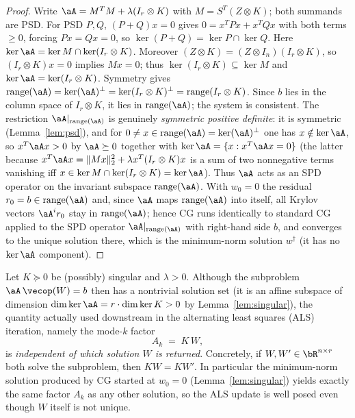 \begin{proof}
Write $\aA=M^{T}M+\lambda(I_r\otimes K)$ with $M=S^{T}(Z\otimes K)$; both
summands are PSD. For PSD $P,Q$, $(P+Q)x=0$ gives
$0=x^{T}Px+x^{T}Qx$ with both terms $\ge0$, forcing $Px=Qx=0$, so
$\ker(P+Q)=\ker P\cap\ker Q$. Here
$\ker\aA=\ker M\cap\ker(I_r\otimes K)$. Moreover
$(Z\otimes K)=(Z\otimes I_n)(I_r\otimes K)$, so $(I_r\otimes K)x=0$ implies
$Mx=0$; thus $\ker(I_r\otimes K)\subseteq\ker M$ and
$\ker\aA=\ker(I_r\otimes K)$. Symmetry gives
$\operatorname{range}(\aA)=\ker(\aA)^{\perp}=\ker(I_r\otimes K)^{\perp}
=\operatorname{range}(I_r\otimes K)$. Since $b$ lies in the column space of
$I_r\otimes K$, it lies in $\operatorname{range}(\aA)$; the system is
consistent. The restriction $\aA|_{\operatorname{range}(\aA)}$ is genuinely
\emph{symmetric positive definite}: it is symmetric (Lemma~\ref{lem:psd}), and
for $0\neq x\in\operatorname{range}(\aA)=\ker(\aA)^{\perp}$ one has $x\notin\ker\aA$,
so $x^{T}\aA x>0$ by $\aA\succeq0$ together with $\ker\aA=\{x:x^{T}\aA x=0\}$
(the latter because $x^{T}\aA x=\|Mx\|_2^2+\lambda x^{T}(I_r\otimes K)x$ is a sum
of two nonnegative terms vanishing iff $x\in\ker M\cap\ker(I_r\otimes K)=\ker\aA$).
Thus $\aA$ acts as an SPD operator on the invariant subspace
$\operatorname{range}(\aA)$. With $w_0=0$ the residual $r_0=b\in\operatorname{range}(\aA)$ and,
since $\aA$ maps $\operatorname{range}(\aA)$ into itself, all Krylov vectors
$\aA^{i}r_0$ stay in $\operatorname{range}(\aA)$; hence CG runs identically to
standard CG applied to the SPD operator $\aA|_{\operatorname{range}(\aA)}$ with
right-hand side $b$, and converges to the unique solution there, which is the
minimum-norm solution $w^{\dagger}$ (it has no $\ker\aA$ component).
\end{proof}

\begin{lemma}[The ALS factor $A_k=KW$ is well defined under singular $K$]
\label{lem:welldef}
Let $K\succeq0$ be (possibly) singular and $\lambda>0$. Although the
subproblem $\aA\,\vecop(W)=b$ then has a nontrivial solution set (it is an
affine subspace of dimension $\dim\ker\aA=r\cdot\dim\ker K>0$ by
Lemma~\ref{lem:singular}), the quantity actually used downstream in the
alternating least squares (ALS) iteration, namely the mode-$k$ factor
\[
  A_k \;=\; K\,W,
\]
is \emph{independent of which solution $W$ is returned}. Concretely, if
$W,W'\in\bR^{n\times r}$ both solve the subproblem, then $KW=KW'$. In
particular the minimum-norm solution produced by CG started at $w_0=0$
(Lemma~\ref{lem:singular}) yields exactly the same factor $A_k$ as any other
solution, so the ALS update is well posed even though $W$ itself is not unique.
\end{lemma}

